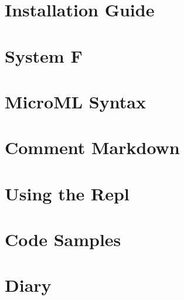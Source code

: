 \documentclass[12pt, a4paper]{report}
\begin{document}
\begin{appendices}
    \chapter{Installation Guide}
    
    \chapter{System F}
    \label{appendix:sysf}
    
    \chapter{MicroML Syntax}
    \label{appendix:syntax}
    
    \chapter{Comment Markdown}
    \label{appendix:md}
    
    \chapter{Using the Repl}
    \label{appendix:repl}
    
    \chapter{Code Samples}
    \label{appendix:samples}
    
    \chapter{Diary}
    \label{appendix:diary}
    
\end{appendices}

\nocite{adams2012layout}
\nocite{9780511608865}
\nocite{Wadler:1995:MFP:647698.734146}
\nocite{958}
\nocite{Steele:1994:BIC:174675.178068}

{}

\end{document}
